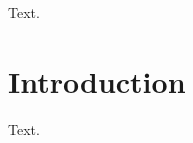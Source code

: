 \documentclass[12pt, a4paper, oneside, BCOR=8mm, DIV=12, parskip=half, bibliography=totoc, listof=totoc]{scrbook}
\begin{document}
\frontmatter
\tableofcontents
{}
Text.
\mainmatter
\chapter{Introduction}
Text.
\end{document}
